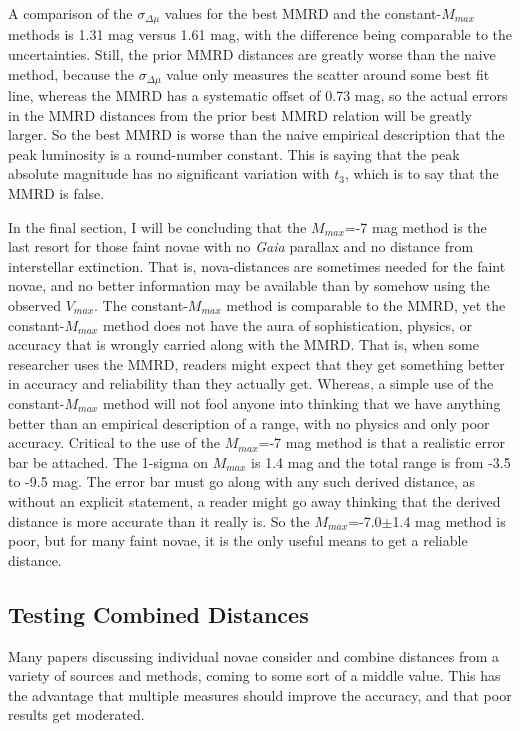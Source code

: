 \documentclass[a4paper,fleqn,usenatbib]{mnras}
\begin{document}
A comparison of the $\sigma_{\Delta \mu}$ values for the best MMRD and the constant-$M_{max}$ methods is 1.31 mag versus 1.61 mag, with the difference being comparable to the uncertainties.  Still, the prior MMRD distances are greatly worse than the naive method, because the $\sigma_{\Delta \mu}$ value only measures the scatter around some best fit line, whereas the MMRD has a systematic offset of 0.73 mag, so the actual errors in the MMRD distances from the prior best MMRD relation will be greatly larger.  So the best MMRD is worse than the naive empirical description that the peak luminosity is a round-number constant.  This is saying that the peak absolute magnitude has no significant variation with $t_3$, which is to say that the MMRD is false.

In the final section, I will be concluding that the $M_{max}$=-7 mag method is the last resort for those faint novae with no {\it Gaia} parallax and no distance from interstellar extinction.  That is, nova-distances are sometimes needed for the faint novae, and no better information may be available than by somehow using the observed $V_{max}$.  The constant-$M_{max}$ method is comparable to the MMRD, yet the constant-$M_{max}$ method does not have the aura of sophistication, physics, or accuracy that is wrongly carried along with the MMRD.  That is, when some researcher uses the MMRD, readers might expect that they get something better in accuracy and reliability than they actually get.  Whereas, a simple use of the constant-$M_{max}$ method will not fool anyone into thinking that we have anything better than an empirical description of a range, with no physics and only poor accuracy.  Critical to the use of the $M_{max}$=-7 mag method is that a realistic error bar be attached.  The 1-sigma on $M_{max}$ is 1.4 mag and the total range is from -3.5 to -9.5 mag.  The error bar must go along with any such derived distance, as without an explicit statement, a reader might go away thinking that the derived distance is more accurate than it really is.  So the $M_{max}$=-7.0$\pm$1.4 mag method is poor, but for many faint novae, it is the only useful means to get a reliable distance.

\subsection{Testing Combined Distances}

Many papers discussing individual novae consider and combine distances from a variety of sources and methods, coming to some sort of a middle value.  This has the advantage that multiple measures should improve the accuracy, and that poor results get moderated.  
\end{document}
